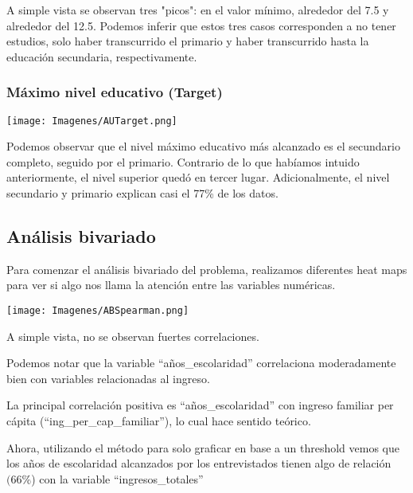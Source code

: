 \documentclass[a4paper]{article}
\begin{document}
            A simple vista se observan tres "picos": en el valor mínimo, alrededor del 7.5 y alrededor del 12.5. Podemos inferir que estos tres casos corresponden a no tener estudios, solo haber transcurrido el primario y haber transcurrido hasta la educación secundaria, respectivamente.
           
            \subsubsection{Máximo nivel educativo (Target)}
           
            \begin{center}
                \texttt{[image: Imagenes/AUTarget.png]}    
            \end{center}
           
            Podemos observar que el nivel máximo educativo más alcanzado es el secundario completo, seguido por el primario. Contrario de lo que habíamos intuido anteriormente, el nivel superior quedó en tercer lugar. Adicionalmente, el nivel secundario y primario explican casi el 77\% de los datos.

    
    \newpage
    
    \subsection{Análisis bivariado}
 
        Para comenzar el análisis bivariado del problema, realizamos diferentes heat maps para ver si algo nos llama la atención entre las variables numéricas.        
       
        \begin{center}
            \texttt{[image: Imagenes/ABSpearman.png]}
        \end{center}
 
        A simple vista, no se observan fuertes correlaciones.
 
        Podemos notar que la variable ``años\_escolaridad'' correlaciona moderadamente bien con variables relacionadas al ingreso.
 
        La principal correlación positiva es ``años\_escolaridad'' con ingreso familiar per cápita (``ing\_per\_cap\_familiar''), lo cual hace sentido teórico.
 
        Ahora, utilizando el método para solo graficar en base a un threshold vemos que los años de escolaridad alcanzados por los entrevistados tienen algo de relación $(66\%$) con la variable ``ingresos\_totales''
\end{document}
